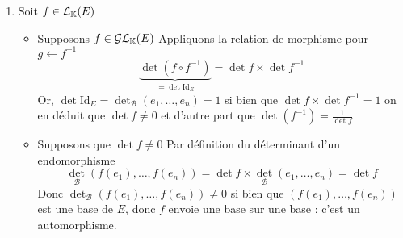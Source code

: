 \documentclass{article}
\renewenvironment{question_kholle}[2][ ]
{
	\subsection{\texorpdfstring{#2}{}}
	\notblank{#1}
	{
		\noindent #1
		\bigbreak
	}
	{}
	\begin{proof}
}
{
	\end{proof}
}
\begin{document}
\begin{question_kholle}
\begin{enumerate}
    \item Soit $f \in \mathcal{L}_{\mathbb K}(E)$
          \begin{itemize}
            \item Supposons $f \in \mathcal{GL}_{\mathbb K}(E)$
                  Appliquons la relation de morphisme pour $g \leftarrow f^{-1}$
                  $$
                    \underbrace{ \det(f \circ  f^{-1}) }_{ = \det \mathrm{Id}_{E} } = \det f \times \det f^{-1}
                  $$
                  Or, $\det \mathrm{Id}_{E}= \det_{\mathcal{B}}(e_{1}, \dots, e_{n}) = 1$ si bien que $\det f \times \det f^{-1} = 1$ on en déduit que $\det f \neq 0$ et d'autre part que $\det (f^{-1}) = \frac{1}{\det f}$
            \item Supposons que $\det f \neq 0$
                  Par définition du déterminant d'un endomorphisme
                  $$
                    \det_{\mathcal{B}}(f(e_{1}), \dots, f(e_{n})) = \det f \times \det_{\mathcal{B}}(e_{1}, \dots, e_{n}) = \det f
                  $$
                  Donc $\det_{\mathcal{B}}(f(e_{1}), \dots, f(e_{n})) \neq 0$ si bien que $(f(e_{1}), \dots, f(e_{n}))$ est une base de $E$, donc $f$ envoie une base sur une base : c'est un automorphisme.
          \end{itemize}
  \end{enumerate}
\end{question_kholle}
\end{document}
